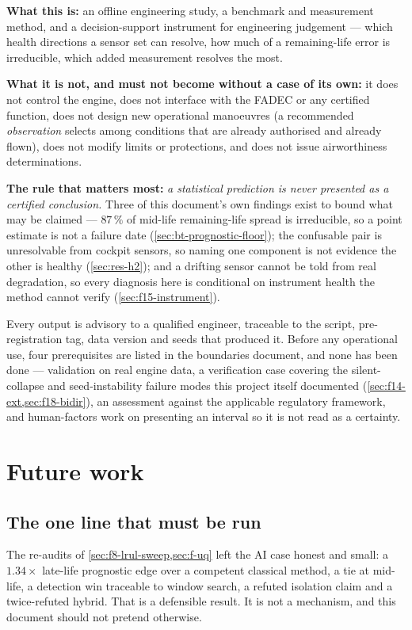\textbf{What this is:} an offline engineering study, a benchmark and measurement method, and a
decision-support instrument for engineering judgement --- which health directions a sensor set
can resolve, how much of a remaining-life error is irreducible, which added measurement resolves
the most.

\textbf{What it is not, and must not become without a case of its own:} it does not control the
engine, does not interface with the FADEC or any certified function, does not design new
operational manoeuvres (a recommended \emph{observation} selects among conditions that are
already authorised and already flown), does not modify limits or protections, and does not issue
airworthiness determinations.

\textbf{The rule that matters most:} \emph{a statistical prediction is never presented as a
certified conclusion.} Three of this document's own findings exist to bound what may be claimed
--- $87\,\%$ of mid-life remaining-life spread is irreducible, so a point estimate is not a
failure date (\cref{sec:bt-prognostic-floor}); the confusable pair is unresolvable from cockpit
sensors, so naming one component is not evidence the other is healthy (\cref{sec:res-h2});
and a drifting sensor cannot be told from real degradation, so every diagnosis here is
conditional on instrument health the method cannot verify (\cref{sec:f15-instrument}).

Every output is advisory to a qualified engineer, traceable to the script, pre-registration tag,
data version and seeds that produced it. Before any operational use, four prerequisites are
listed in the boundaries document, and none has been done --- validation on real engine data,
a verification case covering the silent-collapse and seed-instability failure modes this project
itself documented (\cref{sec:f14-ext,sec:f18-bidir}), an assessment against the applicable
regulatory framework, and human-factors work on presenting an interval so it is not read as a
certainty.

\section{Future work}

\subsection{The one line that must be run}
\label{sec:future-f12}

The re-audits of \cref{sec:f8-lrul-sweep,sec:f-uq} left the AI case honest and small: a
$1.34\times$ late-life prognostic edge over a competent classical method, a tie at mid-life, a
detection win traceable to window search, a refuted isolation claim and a twice-refuted
hybrid. That is a defensible result. It is not a mechanism, and this document should not
pretend otherwise.

